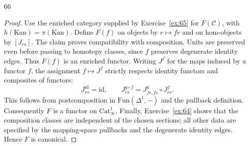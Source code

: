 \begin{exercise}{66}
\begin{proof}
Use the enriched category supplied by
Exercise~\ref{ex:65} for $F(\mathcal C)$, with
$h(\mathrm{Kan})=\pi(\mathrm{Kan})$.
Define $F(f)$ on objects by $r\mapsto fr$ and on
hom-objects by $[J_{rs}]$.
The claim proves compatibility with composition.
Units are preserved even before passing to homotopy
classes, since $f$ preserves degenerate identity edges.
Thus $F(f)$ is an enriched functor.
Writing $J^f$ for the maps induced by a functor $f$,
the assignment $f\mapsto J^f$ strictly respects identity
functors and composites of functors:
\[
 J^{\mathrm{id}}_{rs}=\mathrm{id},
 \qquad J^{g\circ f}_{rs}=J^g_{fr,fs}\circ J^f_{rs}.
\]
This follows from postcomposition in
$\mathrm{Fun}(\Delta^1,-)$ and the pullback definition.
Consequently $F$ is a functor on $\mathrm{Cat}^1_\infty$.
Finally, Exercise~\ref{ex:64} shows that the composition
classes are independent of the chosen sections; all
other data are specified by the mapping-space pullbacks
and the degenerate identity edges.
Hence $F$ is canonical.
\end{proof}
\end{exercise}
